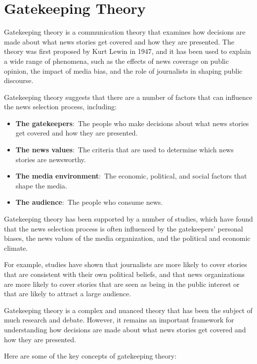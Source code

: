 \documentclass[
  b5paper]{book}
\begin{document}
\hypertarget{gatekeeping-theory}{%
\section{Gatekeeping Theory}\label{gatekeeping-theory}}

Gatekeeping theory is a communication theory that examines how decisions are made about what news stories get covered and how they are presented. The theory was first proposed by Kurt Lewin in 1947, and it has been used to explain a wide range of phenomena, such as the effects of news coverage on public opinion, the impact of media bias, and the role of journalists in shaping public discourse.

Gatekeeping theory suggests that there are a number of factors that can influence the news selection process, including:

\begin{itemize}
\item
  \textbf{The gatekeepers}:~The people who make decisions about what news stories get covered and how they are presented.
\item
  \textbf{The news values}:~The criteria that are used to determine which news stories are newsworthy.
\item
  \textbf{The media environment}:~The economic, political, and social factors that shape the media.
\item
  \textbf{The audience}:~The people who consume news.
\end{itemize}

Gatekeeping theory has been supported by a number of studies, which have found that the news selection process is often influenced by the gatekeepers' personal biases, the news values of the media organization, and the political and economic climate.

For example, studies have shown that journalists are more likely to cover stories that are consistent with their own political beliefs, and that news organizations are more likely to cover stories that are seen as being in the public interest or that are likely to attract a large audience.

Gatekeeping theory is a complex and nuanced theory that has been the subject of much research and debate. However, it remains an important framework for understanding how decisions are made about what news stories get covered and how they are presented.

Here are some of the key concepts of gatekeeping theory:
\end{document}
